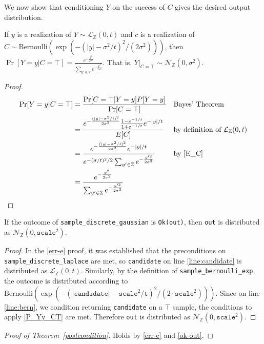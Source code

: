 \documentclass{article}
\begin{document}
We now show that conditioning $Y$ on the success of $C$ gives the desired output distribution.
\begin{theorem}\cite{CKS20}
    \label{P_Yy_CT} If $y$ is a realization of $Y \sim \mathcal{L}_\mathbb{Z}(0, t)$ and $c$ is a realization of $C \sim \mathrm{Bernoulli}(\exp(-(|y| - \sigma^2 / t)^2 / (2 \sigma^2)))$, then
    $\Pr[Y=y | C=\top] = \frac{e^{-\frac{y^2}{2\sigma^2}}}{\sum_{y' \in \mathbb{Z}} e^{-\frac{y'^2}{2\sigma^2}}}$. That is, $Y|_{C=\top} \sim \mathcal{N}_\mathbb{Z}(0, \sigma^2)$.
\end{theorem}

\begin{proof}
    \begin{align*}
        \Pr[Y=y | C=\top] &= \frac{\Pr[C=\top|Y=y]P[Y=y]}{\Pr[C=\top]} && \text{Bayes' Theorem} \\
        &= \frac{e^{-\frac{(|y| - \sigma^2/t)^2}{2\sigma^2}} \frac{1 - e^{-1/t}}{1 + e^{-1/t}} e^{-|y|/t}}{E[C]} && \text{by definition of } \mathcal{L}_\mathbb{Z}(0, t) \\
        &= \frac{e^{-\frac{(|y| - \sigma^2/t)^2}{2\sigma^2}} e^{-|y|/t}}{e^{-(\sigma/t)^2/2} \sum_{y' \in \mathbb{Z}} e^{-\frac{y'^2}{2\sigma^2}}} && \text{by } \ref{E_C}\\
        &= \frac{e^{-\frac{y^2}{2\sigma^2}}}{\sum_{y' \in \mathbb{Z}} e^{-\frac{y'^2}{2\sigma^2}}}
    \end{align*}
\end{proof}

\begin{lemma}\label{ok-out}
    If the outcome of \texttt{sample\_discrete\_gaussian} is \texttt{Ok(out)},
    then \texttt{out} is distributed as $\mathcal{N}_\mathbb{Z}(0, \texttt{scale}^2)$.
\end{lemma}

\begin{proof}
    In the \ref{err-e} proof, it was established that the preconditions on \texttt{sample\_discrete\_laplace} are met,
    so \texttt{candidate} on line \ref{line:candidate} is distributed as $\mathcal{L}_\mathbb{Z}(0, t)$.
    Similarly, by the definition of \texttt{sample\_bernoulli\_exp}, the outcome is distributed according to $\mathrm{Bernoulli}(\exp(-(|\texttt{candidate}| - \texttt{scale}^2 / \texttt{t})^2 / (2 \cdot \texttt{scale}^2)))$.
    Since on line \ref{line:bern}, we condition returning \texttt{candidate} on a $\top$ sample,
    the conditions to apply \ref{P_Yy_CT} are met.
    Therefore \texttt{out} is distributed as $\mathcal{N}_\mathbb{Z}(0, \texttt{scale}^2)$.
\end{proof}

\begin{proof}[Proof of Theorem~\ref{postcondition}]
    Holds by \ref{err-e} and \ref{ok-out}.
\end{proof}



\end{document}
